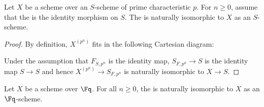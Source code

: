 \begin{proposition} \label{proposition:twist_of_scheme_is_isomorphic_to_scheme_if_absolute_frobenius_on_base_is_identity}
    Let $X$ be a scheme over an $S$-scheme of prime characteristic $p$. For $n \geq 0$, assume that the  is the identity morphism on $S$. The  is naturally isomorphic to $X$ as an $S$-scheme. 
\end{proposition}
\begin{proof}
    By definition, $X^{(p^n)}$ fits in the following Cartesian diagram:
    \begin{center}
    \end{center}
    Under the assumption that $F_{S,p^n}$ is the identity map, $S_{F,p^n} \to S$ is the identity map $S \to S$ and hence $X^{(p^n)} \to S_{F,p^n}$ is naturally isomorphic to $X \to S$.
\end{proof}

\begin{corollary}
    Let $X$ be a scheme over $\Fq$. For all $n \geq 0$, the  is naturally isomorphic to $X$ as an $\Fq$-scheme.
\end{corollary}

